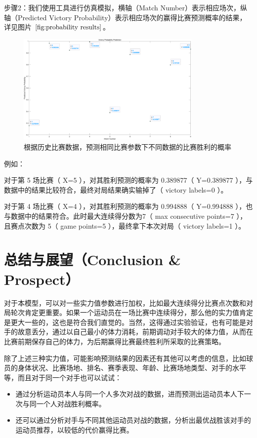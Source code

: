 \documentclass[12pt]{article}
\begin{document}
步骤2：我们使用工具进行仿真模拟，横轴（Match Number）表示相应场次，纵轴（Predicted Victory Probability）表示相应场次的赢得比赛预测概率的结果，详见图片 $\ref{fig:probability results}$。

\begin{figure}[h]
	\centering
	\includegraphics[width=0.8\textwidth]{../images/probability results}
	\caption{根据历史比赛数据，预测相同比赛参数下不同数据的比赛胜利的概率}
	\label{fig:probability results}
\end{figure}
例如：

对于第 5 场比赛（ X=5 ），对其胜利预测的概率为 0.389877（ Y=0.389877 ），与数据中的结果比较符合，最终对局结果确实输掉了（ victory labels=0 ）。

对于第 4 场比赛（ X=4 ），对其胜利预测的概率为 0.994888（ Y=0.994888 ），也与数据中的结果符合。此时最大连续得分数为7（ max consecutive points=7 ），且赛点次数为 5（ game points=5 ），最终拿下本次对局（ victory labels=1 ）。


\section{总结与展望（Conclusion \& Prospect）}
对于本模型，可以对一些实力值参数进行加权，比如最大连续得分比赛点次数和对局轮次肯定更重要。如果一个运动员在一场比赛中连续得分，那么他的实力值肯定是更大一些的，这也是符合我们直觉的。当然，这得通过实验验证，也有可能是对手的故意丢分，通过以自己最小的体力消耗，前期调动对手较大的体力值，从而在比赛前期保存自己的体力，为后期赢得比赛最终胜利所采取的比赛策略。

除了上述三种实力值，可能影响预测结果的因素还有其他可以考虑的信息，比如球员的身体状况、比赛场地、排名、赛季表现、年龄、比赛场地类型、对手的水平等，而且对于同一个对手也可以试试：
\begin{itemize}
	\item 通过分析运动员本人与同一个人多次对战的数据，进而预测出运动员本人下一次与同一个人对战胜利概率。
	\item 还可以通过分析对手与不同其他运动员对战的数据，分析出最优战胜该对手的运动员推荐，以较低的代价赢得比赛。
\end{itemize}
\end{document}
